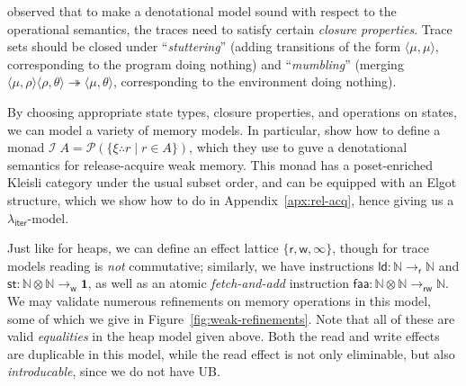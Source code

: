 \documentclass[acmsmall,screen,anonymous,review]{acmart}
\newcommand{\mc}[1]{\ensuremath{\mathcal{#1}}}
\newcommand{\mb}[1]{\ensuremath{\mathbf{#1}}}
\newcommand{\ms}[1]{\ensuremath{\mathsf{#1}}}
\newcommand{\nats}{\mathbb{N}}
\newcommand{\tref}{\twoheadrightarrow}
\newcommand{\subiterexp}{\texorpdfstring{\(\lambda_{\ms{iter}}\)}{lambda-iter}}
\newcommand{\tret}[2]{#1 \therefore #2}
\begin{document}
\citet{brookes-full-abstraction-96} observed that to make a denotational model sound with respect to
the operational semantics, the traces need to satisfy certain \emph{closure properties}. Trace sets
should be closed under ``\emph{stuttering}'' (adding transitions of the form $\langle \mu, \mu
\rangle$, corresponding to the program doing nothing) and ``\emph{mumbling}'' (merging $\langle \mu,
\rho \rangle\langle \rho, \theta \rangle \tref \langle \mu, \theta \rangle$, corresponding to the
environment doing nothing).

By choosing appropriate state types, closure properties, and operations on states, we can model a
variety of memory models. In particular,
\citet{release-acquire} show how to define a monad $\mc{I}\;A = \mc{P}(\{\tret{\xi}{r} \mid r \in
A\})$, which they use to guve a denotational semantics for release-acquire weak memory. This monad
has a poset-enriched Kleisli category under the usual subset order, and can be equipped with an
Elgot structure, which we show how to do in
Appendix~\ref{apx:rel-acq}, hence giving us a \subiterexp{}-model.

Just like for heaps, we can define an effect lattice $\{\ms{r}, \ms{w}, \infty\}$, though
for trace models reading is \emph{not} commutative; similarly, we have instructions $\ms{ld}: \nats
\to_{\ms{r}} \nats$ and $\ms{st}: \nats \otimes \nats \to_{\ms{w}} \mb{1}$, as well as an atomic
\emph{fetch-and-add} instruction $\ms{faa}: \nats \otimes \nats \to_{\ms{rw}} \nats$. We may
validate numerous refinements on memory operations in this model, some of which we give in
Figure~\ref{fig:weak-refinements}. Note that all of these are valid \emph{equalities} in the heap
model given above. Both the read and write effects are duplicable in this model, while the read
effect is not only eliminable, but also \emph{introducable}, since we do not have UB.
\end{document}
